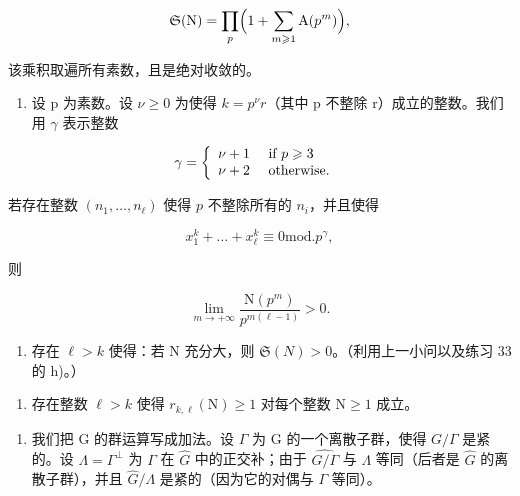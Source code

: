 \[
\mathfrak {S} (\mathrm{N}) = \prod_ {p} \Bigl (1 + \sum_ {m \geqslant 1} \mathrm{A} (p ^ {m}) \Bigr),
\]

该乘积取遍所有素数，且是绝对收敛的。

\begin{enumerate}
\def\labelenumi{\alph{enumi})}
\setcounter{enumi}{7}
\tightlist
\item
  设 p 为素数。设 \(\nu \geqslant 0\) 为使得 \(k = p^{\nu}r\)（其中 p 不整除 r）成立的整数。我们用 \(\gamma\) 表示整数
\end{enumerate}

\[
\gamma = \left\{ \begin{array}{l l} \nu + 1 & \text { if } p \geqslant 3 \\ \nu + 2 & \text { otherwise. } \end{array} \right.
\]

若存在整数 \((n_1, \ldots, n_\ell)\) 使得 \(p\) 不整除所有的 \(n_i\)，并且使得

\[
x _ {1} ^ {k} + \dots + x _ {\ell} ^ {k} \equiv 0 \mathrm{mod.} p ^ {\gamma},
\]

则

\[
\lim _ {m \to + \infty} \frac {\mathrm{N} (p ^ {m})}{p ^ {m (\ell - 1)}} > 0.
\]

\begin{enumerate}
\def\labelenumi{\roman{enumi})}
\tightlist
\item
  存在 \(\ell > k\) 使得：若 N 充分大，则 \(\mathfrak{S}(N) > 0\)。（利用上一小问以及练习 33 的 h)。）
\end{enumerate}

\begin{enumerate}
\def\labelenumi{\alph{enumi})}
\setcounter{enumi}{9}
\tightlist
\item
  存在整数 \(\ell > k\) 使得 \(r_{k,\ell}(\mathrm{N}) \geqslant 1\) 对每个整数 \(\mathrm{N} \geqslant 1\) 成立。
\end{enumerate}

\begin{enumerate}
\def\labelenumi{\arabic{enumi})}
\setcounter{enumi}{67}
\tightlist
\item
  我们把 G 的群运算写成加法。设 \(\Gamma\) 为 G 的一个离散子群，使得 \(G / \Gamma\) 是紧的。设 \(\Lambda = \Gamma^{\perp}\) 为 \(\Gamma\) 在 \(\widehat{G}\) 中的正交补；由于 \(\widehat{G / \Gamma}\) 与 \(\Lambda\) 等同（后者是 \(\widehat{G}\) 的离散子群），并且 \(\widehat{G} / \Lambda\) 是紧的（因为它的对偶与 \(\Gamma\) 等同）。
\end{enumerate}

